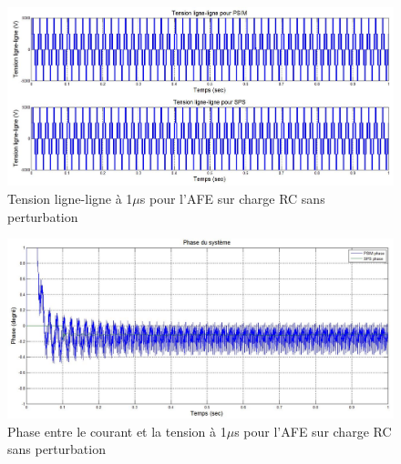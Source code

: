 \begin{figure}[htb]
\centering
\includegraphics[scale=0.5]{fig/L.jpg}
\caption{Tension ligne-ligne à 1$\mu$s pour l'AFE sur charge RC sans perturbation}
\label{AF_RC_ten_L}
\end{figure}

\begin{figure}[htb]
\centering
\includegraphics[scale=0.5]{fig/phase.jpg}
\caption{Phase entre le courant et la tension à 1$\mu$s pour l'AFE sur charge RC sans perturbation}
\label{AF_RC_PH}
\end{figure}


\clearpage

